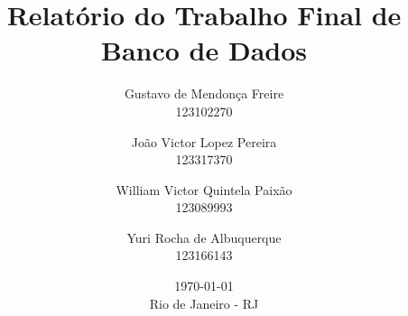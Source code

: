 \usepackage[brazil]{babel}
\usepackage[utf8]{inputenc}
\usepackage[T1]{fontenc}


\usepackage{tocloft}
\usepackage{csquotes}
\usepackage[backend=biber, maxnames=99]{biblatex}
\usepackage{graphicx}
\usepackage{float}

\graphicspath{{figures/}}


\usepackage[margin=0.9in]{geometry}         %
\usepackage{listings}
\usepackage{amsmath, amssymb}             %
\usepackage{indentfirst}                  %
\usepackage{xcolor}                       %
\setlength{\parskip}{\baselineskip}       %
\setlength{\footnotesep}{0.8em}           %
\setlength{\skip\footins}{2em}            %
\setlength{\cftbeforechapskip}{12pt}      %
\setlength{\cftbeforesecskip}{6pt}        %


\usepackage{hyperref}

\title{ Relatório do Trabalho Final de Banco de Dados}
\date{\today\\ \vfill Rio de Janeiro - RJ}
\author{Gustavo de Mendonça Freire     \\ 123102270
   \and João Victor Lopez Pereira      \\ 123317370
   \and William Victor Quintela Paixão \\ 123089993
   \and Yuri Rocha de Albuquerque      \\ 123166143
}


